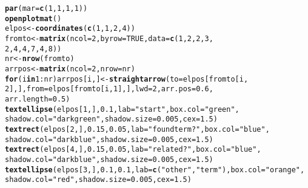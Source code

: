 \documentclass{article}\usepackage[]{graphicx}\usepackage[]{color}
\makeatletter
\newcommand{\hlnum}[1]{\textcolor[rgb]{0.686,0.059,0.569}{#1}}%
\newcommand{\hlstr}[1]{\textcolor[rgb]{0.192,0.494,0.8}{#1}}%
\newcommand{\hlopt}[1]{\textcolor[rgb]{0,0,0}{#1}}%
\newcommand{\hlstd}[1]{\textcolor[rgb]{0.345,0.345,0.345}{#1}}%
\newcommand{\hlkwa}[1]{\textcolor[rgb]{0.161,0.373,0.58}{\textbf{#1}}}%
\newcommand{\hlkwb}[1]{\textcolor[rgb]{0.69,0.353,0.396}{#1}}%
\newcommand{\hlkwc}[1]{\textcolor[rgb]{0.333,0.667,0.333}{#1}}%
\newcommand{\hlkwd}[1]{\textcolor[rgb]{0.737,0.353,0.396}{\textbf{#1}}}%
\newenvironment{kframe}{%
 \def\at@end@of@kframe{}%
 \ifinner\ifhmode%
  \def\at@end@of@kframe{\end{minipage}}%
  \begin{minipage}{\columnwidth}%
 \fi\fi%
 \def\FrameCommand##1{\hskip\@totalleftmargin \hskip-\fboxsep
 \colorbox{shadecolor}{##1}\hskip-\fboxsep
     \hskip-\linewidth \hskip-\@totalleftmargin \hskip\columnwidth}%
 \MakeFramed {\advance\hsize-\width
   \@totalleftmargin\z@ \linewidth\hsize
   \@setminipage}}%
 {\par\unskip\endMakeFramed%
 \at@end@of@kframe}
\newenvironment{knitrout}{}{} %
\makeatother
\begin{document}
\begin{knitrout}
\begin{kframe}
\begin{alltt}
\hlkwd{par}\hlstd{(}\hlkwc{mar} \hlstd{=} \hlkwd{c}\hlstd{(}\hlnum{1}\hlstd{,} \hlnum{1}\hlstd{,} \hlnum{1}\hlstd{,} \hlnum{1}\hlstd{))}
\hlkwd{openplotmat}\hlstd{()}
\hlstd{elpos} \hlkwb{<-} \hlkwd{coordinates}\hlstd{(}\hlkwd{c}\hlstd{(}\hlnum{1}\hlstd{,} \hlnum{1}\hlstd{,} \hlnum{2}\hlstd{,} \hlnum{4}\hlstd{))}
\hlstd{fromto} \hlkwb{<-} \hlkwd{matrix}\hlstd{(}\hlkwc{ncol} \hlstd{=} \hlnum{2}\hlstd{,} \hlkwc{byrow} \hlstd{=} \hlnum{TRUE}\hlstd{,} \hlkwc{data} \hlstd{=} \hlkwd{c}\hlstd{(}\hlnum{1}\hlstd{,} \hlnum{2}\hlstd{,} \hlnum{2}\hlstd{,} \hlnum{3}\hlstd{,}
    \hlnum{2}\hlstd{,} \hlnum{4}\hlstd{,} \hlnum{4}\hlstd{,} \hlnum{7}\hlstd{,} \hlnum{4}\hlstd{,} \hlnum{8}\hlstd{))}
\hlstd{nr} \hlkwb{<-} \hlkwd{nrow}\hlstd{(fromto)}
\hlstd{arrpos} \hlkwb{<-} \hlkwd{matrix}\hlstd{(}\hlkwc{ncol} \hlstd{=} \hlnum{2}\hlstd{,} \hlkwc{nrow} \hlstd{= nr)}
\hlkwa{for} \hlstd{(i} \hlkwa{in} \hlnum{1}\hlopt{:}\hlstd{nr) arrpos[i, ]} \hlkwb{<-} \hlkwd{straightarrow}\hlstd{(}\hlkwc{to} \hlstd{= elpos[fromto[i,}
    \hlnum{2}\hlstd{], ],} \hlkwc{from} \hlstd{= elpos[fromto[i,} \hlnum{1}\hlstd{], ],} \hlkwc{lwd} \hlstd{=} \hlnum{2}\hlstd{,} \hlkwc{arr.pos} \hlstd{=} \hlnum{0.6}\hlstd{,}
    \hlkwc{arr.length} \hlstd{=} \hlnum{0.5}\hlstd{)}
\hlkwd{textellipse}\hlstd{(elpos[}\hlnum{1}\hlstd{, ],} \hlnum{0.1}\hlstd{,} \hlkwc{lab} \hlstd{=} \hlstr{"start"}\hlstd{,} \hlkwc{box.col} \hlstd{=} \hlstr{"green"}\hlstd{,}
    \hlkwc{shadow.col} \hlstd{=} \hlstr{"darkgreen"}\hlstd{,} \hlkwc{shadow.size} \hlstd{=} \hlnum{0.005}\hlstd{,} \hlkwc{cex} \hlstd{=} \hlnum{1.5}\hlstd{)}
\hlkwd{textrect}\hlstd{(elpos[}\hlnum{2}\hlstd{, ],} \hlnum{0.15}\hlstd{,} \hlnum{0.05}\hlstd{,} \hlkwc{lab} \hlstd{=} \hlstr{"found term?"}\hlstd{,} \hlkwc{box.col} \hlstd{=} \hlstr{"blue"}\hlstd{,}
    \hlkwc{shadow.col} \hlstd{=} \hlstr{"darkblue"}\hlstd{,} \hlkwc{shadow.size} \hlstd{=} \hlnum{0.005}\hlstd{,} \hlkwc{cex} \hlstd{=} \hlnum{1.5}\hlstd{)}
\hlkwd{textrect}\hlstd{(elpos[}\hlnum{4}\hlstd{, ],} \hlnum{0.15}\hlstd{,} \hlnum{0.05}\hlstd{,} \hlkwc{lab} \hlstd{=} \hlstr{"related?"}\hlstd{,} \hlkwc{box.col} \hlstd{=} \hlstr{"blue"}\hlstd{,}
    \hlkwc{shadow.col} \hlstd{=} \hlstr{"darkblue"}\hlstd{,} \hlkwc{shadow.size} \hlstd{=} \hlnum{0.005}\hlstd{,} \hlkwc{cex} \hlstd{=} \hlnum{1.5}\hlstd{)}
\hlkwd{textellipse}\hlstd{(elpos[}\hlnum{3}\hlstd{, ],} \hlnum{0.1}\hlstd{,} \hlnum{0.1}\hlstd{,} \hlkwc{lab} \hlstd{=} \hlkwd{c}\hlstd{(}\hlstr{"other"}\hlstd{,} \hlstr{"term"}\hlstd{),} \hlkwc{box.col} \hlstd{=} \hlstr{"orange"}\hlstd{,}
    \hlkwc{shadow.col} \hlstd{=} \hlstr{"red"}\hlstd{,} \hlkwc{shadow.size} \hlstd{=} \hlnum{0.005}\hlstd{,} \hlkwc{cex} \hlstd{=} \hlnum{1.5}\hlstd{)}

\end{alltt}
\end{kframe}
\end{knitrout}
\end{document}
